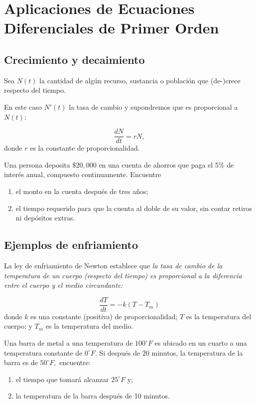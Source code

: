 



\section[Aplicaciones]{Aplicaciones de Ecuaciones Diferenciales de Primer Orden}

\subsection{Crecimiento y decaimiento}


	Sea $N(t)$ la cantidad de algún recurso, sustancia o población que (de-)crece respecto del tiempo.

	En este caso $N'(t)$ la tasa de cambio y supondremos que es proporcional a $N(t):$

	\[
		\label{bron:7.1}
		\dfrac{dN}{dt}=rN,
	\]
	donde $r$ es la constante de proporcionalidad.



	\begin{problema}
		Una persona deposita $\$20,000$ en una cuenta de ahorros que paga el 5\% de interés  anual, compuesto continuamente.
		Encuentre
		\begin{enumerate}
			\item el monto en la cuenta después de tres años;
			\item el tiempo requerido para que la cuenta al doble de su valor, sin contar retiros ni depósitos extras.
		\end{enumerate}

	\end{problema}



\subsection{Ejemplos de enfriamiento}


	La ley de enfriamiento de Newton establece que \emph{la tasa de cambio de la temperatura de un cuerpo (respecto del tiempo) es proporcional a la diferencia entre el cuerpo y el medio circundante:}

	\[
		\label{bron:7.2}
		\dfrac{dT}{dt}=-k\left( T-T_{m} \right)
	\]
	donde $k$ es una constante (positiva) de proporcionalidad; $T$ es la temperatura del cuerpo; y $T_{m}$ es la temperatura del medio.


%
  \begin{problema}
   Una barra de metal a una temperatura de $100^\circ F$ es ubicado en un cuarto a una temperatura constante de $0^\circ F.$ Si después de 20 minutos, la temperatura de la barra es de $50^\circ F,$ encuentre:
   \begin{enumerate}
    \item el tiempo que tomará alcanzar $25^\circ F$ y;
    \item la temperatura de la barra después de 10 minutos.
   \end{enumerate}

  \end{problema}



